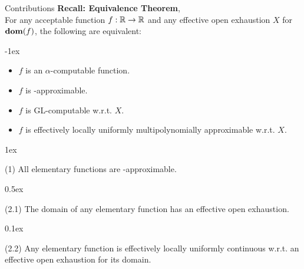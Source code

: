\begin{frame}{Contributions}
    \vspace{-1em}
    {\color{gray}
    \textcolor{OliveGreen}{\textbf{Recall: Equivalence Theorem}, \citep{ModelOfCompForPartFunc_MingQuanFuAndJeffZucker}}\\
    For any {acceptable function} $f:\mathbb{R}\to\mathbb{R}$ and any {effective open exhaustion} $X$ for $\mathbf{dom}(f)$, the following are equivalent:}

    \kern-1ex
        \begin{itemize}
            \setlength\itemsep{-3pt}\color{gray}
            \item $f$ is an $\alpha$-computable function.
            \item $f$ is \WhileCC-approximable.
            \item $f$ is GL-computable w.r.t. $X$.
            \item $f$ is effectively locally uniformly multipolynomially approximable w.r.t. $X$.
        \end{itemize}

    \kern1ex
    \begin{ntheorem}(1)
        All elementary functions are \WhileCC-approximable.
    \end{ntheorem}

    \kern0.5ex
    \begin{ntheorem}(2.1)
        The domain of any elementary function has an effective open exhaustion.
    \end{ntheorem}
    
    \kern0.1ex
    \begin{ntheorem}(2.2)
        Any elementary function is {effectively locally uniformly continuous} w.r.t.\null{} an effective open exhaustion for its domain.
    \end{ntheorem}
\end{frame}
